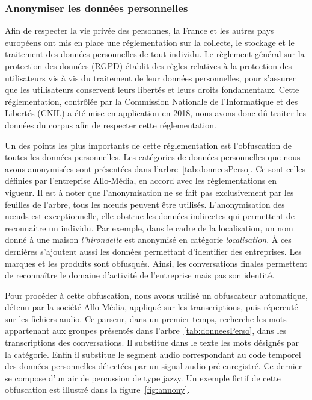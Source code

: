 \subsubsection{Anonymiser les données personnelles}



Afin de respecter la vie privée des personnes, la France et les autres pays européens ont mis en place une réglementation sur la collecte, le stockage et le traitement des données personnelles de tout individu. Le règlement général sur la protection des données (RGPD) établit des règles relatives à la protection des utilisateurs vis à vis du traitement de leur données personnelles, pour s'assurer que les utilisateurs conservent leurs libertés et leurs droits fondamentaux. Cette réglementation, contrôlée par la Commission Nationale de l'Informatique et des Libertés (CNIL) a été mise en application en 2018, nous avons donc dû traiter les données du corpus afin de respecter cette réglementation.

Un des points les plus importants de cette réglementation est l'obfuscation de toutes les données personnelles. Les catégories de données personnelles que nous avons anonymisées sont présentées dans l'arbre~\ref{tab:donneesPerso}. Ce sont celles définies par l'entreprise Allo-Média, en accord avec les réglementations en vigueur. Il est à noter que l'anonymisation ne se fait pas exclusivement par les feuilles de l'arbre, tous les nœuds peuvent être utilisés. L'anonymisation des nœuds est exceptionnelle, elle obstrue les données indirectes qui permettent de reconnaître un individu. Par exemple, dans le cadre de la localisation, un nom donné à une maison \textit{l'hirondelle} est anonymisé en catégorie \textit{localisation}. À ces dernières s'ajoutent aussi les données permettant d'identifier des entreprises. Les marques et les produits sont obfusqués. Ainsi, les conversations finales permettent de reconnaître le domaine d'activité de l'entreprise mais pas son identité.



Pour procéder à cette obfuscation, nous avons utilisé un obfuscateur automatique, détenu par la société Allo-Média, appliqué sur les transcriptions, puis répercuté sur les fichiers audio. Ce parseur, dans un premier temps, recherche les mots appartenant aux groupes présentés dans l'arbre~\ref{tab:donneesPerso}, dans les transcriptions des conversations. Il substitue dans le texte les mots désignés par la catégorie. Enfin il substitue le segment audio correspondant au code temporel des données personnelles détectées par un signal audio pré-enregistré. Ce dernier se compose d'un air de percussion de type jazzy. Un exemple fictif de cette obfuscation est illustré dans la figure~\ref{fig:annony}.

